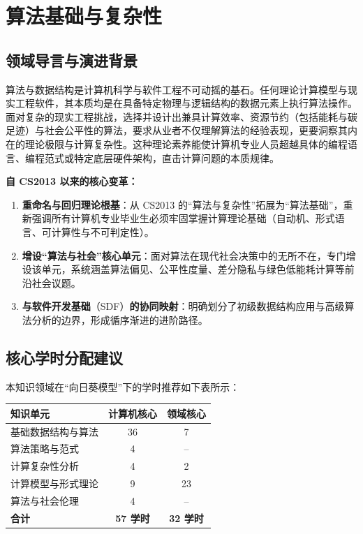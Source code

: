 \chapter{算法基础与复杂性}

\section{领域导言与演进背景}

\begin{preamblebox}[知识领域概述与变革]
算法与数据结构是计算机科学与软件工程不可动摇的基石。任何理论计算模型与现实工程软件，其本质均是在具备特定物理与逻辑结构的数据元素上执行算法操作。面对复杂的现实工程挑战，选择并设计出兼具计算效率、资源节约（包括能耗与碳足迹）与社会公平性的算法，要求从业者不仅理解算法的经验表现，更要洞察其内在的理论极限与计算复杂性。这种理论素养能使计算机专业人员超越具体的编程语言、编程范式或特定底层硬件架构，直击计算问题的本质规律。

\textbf{自 CS2013 以来的核心变革：}
\begin{enumerate}
    \item \textbf{重命名与回归理论根基}：从 CS2013 的“算法与复杂性”拓展为“算法基础”，重新强调所有计算机专业毕业生必须牢固掌握计算理论基础（自动机、形式语言、可计算性与不可判定性）。
    \item \textbf{增设“算法与社会”核心单元}：面对算法在现代社会决策中的无所不在，专门增设该单元，系统涵盖算法偏见、公平性度量、差分隐私与绿色低能耗计算等前沿社会议题。
    \item \textbf{与软件开发基础}（SDF）\textbf{的协同映射}：明确划分了初级数据结构应用与高级算法分析的边界，形成循序渐进的进阶路径。
\end{enumerate}
\end{preamblebox}

\section{核心学时分配建议}

本知识领域在“向日葵模型”下的学时推荐如下表所示：

\begin{table}[H]
\centering
\setlength{\tabcolsep}{4pt}\fontsize{8pt}{9.6pt}\selectfont\begin{tabularx}{\columnwidth}{Y c c}
\toprule
\textbf{知识单元} & \textbf{计算机核心} & \textbf{领域核心} \\
\midrule
基础数据结构与算法 & 36 & 7 \\
算法策略与范式 & 4 & -- \\
计算复杂性分析 & 4 & 2 \\
计算模型与形式理论 & 9 & 23 \\
算法与社会伦理 & 4 & -- \\
\midrule
\textbf{合计} & \textbf{57 学时} & \textbf{32 学时} \\
\bottomrule
\end{tabularx}
\end{table}

